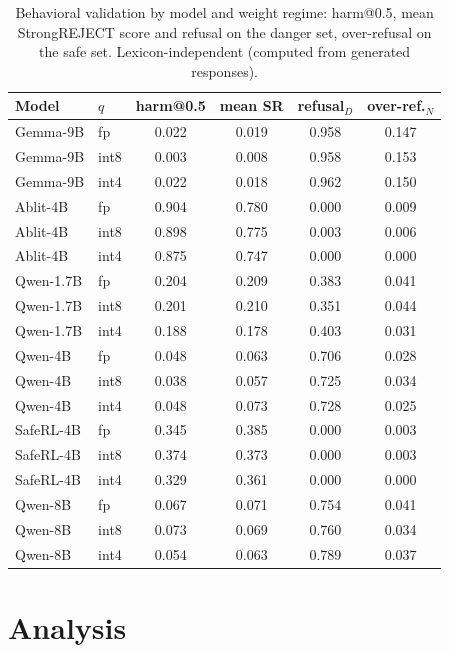 \documentclass[10pt,twocolumn]{article}
\begin{document}
\begin{table}[htbp]
\centering\scriptsize
\setlength{\tabcolsep}{3.5pt}
\caption{Behavioral validation by model and weight regime: harm@0.5, mean StrongREJECT
score and refusal on the danger set, over-refusal on the safe set. Lexicon-independent
(computed from generated responses).}
\label{tab:behavior}
\begin{tabular}{@{}llcccc@{}}
\toprule
Model & $q$ & harm@0.5 & mean SR & refusal$_D$ & over-ref.$_N$ \\
\midrule
Gemma-9B  & fp   & 0.022 & 0.019 & 0.958 & 0.147 \\
Gemma-9B  & int8 & 0.003 & 0.008 & 0.958 & 0.153 \\
Gemma-9B  & int4 & 0.022 & 0.018 & 0.962 & 0.150 \\
\addlinespace
Ablit-4B  & fp   & 0.904 & 0.780 & 0.000 & 0.009 \\
Ablit-4B  & int8 & 0.898 & 0.775 & 0.003 & 0.006 \\
Ablit-4B  & int4 & 0.875 & 0.747 & 0.000 & 0.000 \\
\addlinespace
Qwen-1.7B & fp   & 0.204 & 0.209 & 0.383 & 0.041 \\
Qwen-1.7B & int8 & 0.201 & 0.210 & 0.351 & 0.044 \\
Qwen-1.7B & int4 & 0.188 & 0.178 & 0.403 & 0.031 \\
\addlinespace
Qwen-4B   & fp   & 0.048 & 0.063 & 0.706 & 0.028 \\
Qwen-4B   & int8 & 0.038 & 0.057 & 0.725 & 0.034 \\
Qwen-4B   & int4 & 0.048 & 0.073 & 0.728 & 0.025 \\
\addlinespace
SafeRL-4B & fp   & 0.345 & 0.385 & 0.000 & 0.003 \\
SafeRL-4B & int8 & 0.374 & 0.373 & 0.000 & 0.003 \\
SafeRL-4B & int4 & 0.329 & 0.361 & 0.000 & 0.000 \\
\addlinespace
Qwen-8B   & fp   & 0.067 & 0.071 & 0.754 & 0.041 \\
Qwen-8B   & int8 & 0.073 & 0.069 & 0.760 & 0.034 \\
Qwen-8B   & int4 & 0.054 & 0.063 & 0.789 & 0.037 \\
\bottomrule
\end{tabular}
\end{table}

\section{Analysis}
\label{sec:analysis}
\end{document}
